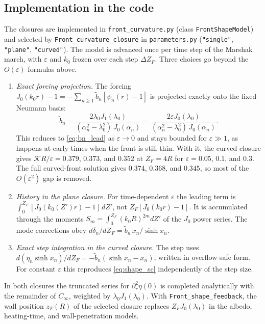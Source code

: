 \documentclass[11pt]{article}
\numberwithin{equation}{section}
\begin{document}
\subsection{Implementation in the code}
The closures are implemented in \texttt{front\_curvature.py} (class \texttt{FrontShapeModel}) and selected by \texttt{Front\_curvature\_closure} in \texttt{parameters.py} (\texttt{"single"}, \texttt{"plane"}, \texttt{"curved"}). The model is advanced once per time step of the Marshak march, with $\varepsilon$ and $k_0$ frozen over each step $\Delta Z_F$. Three choices go beyond the $O(\varepsilon)$ formulas above.
\begin{enumerate}
\item \emph{Exact forcing projection.} The forcing $J_0(k_0r)-1=-\sum_{n\ge1}\tilde b_n[\psi_n(r)-1]$ is projected exactly onto the fixed Neumann basis:
\begin{equation}\tilde b_n=\frac{2\lambda_0J_1(\lambda_0)}{(\alpha_n^2-\lambda_0^2)\,J_0(\alpha_n)}=\frac{2\varepsilon J_0(\lambda_0)}{(\alpha_n^2-\lambda_0^2)\,J_0(\alpha_n)}.\end{equation}
This reduces to \eqref{eq:bn_lead} as $\varepsilon\to0$ and stays bounded for $\varepsilon\gg1$, as happens at early times when the front is still thin. With it, the curved closure gives $\mathcal KR/\varepsilon=0.379$, $0.373$, and $0.352$ at $Z_F=4R$ for $\varepsilon=0.05$, $0.1$, and $0.3$. The full curved-front solution gives $0.374$, $0.368$, and $0.345$, so most of the $O(\varepsilon^2)$ gap is removed.
\item \emph{History in the plane closure.} For time-dependent $\varepsilon$ the leading term is $\int_0^{Z_F}[J_0(k_0(Z')r)-1]\,dZ'$, not $Z_F[J_0(k_0r)-1]$. It is accumulated through the moments $S_m=\int_0^{Z_F}(k_0R)^{2m}dZ'$ of the $J_0$ power series. The mode corrections obey $d\delta_n/dZ_F=\tilde b_n\,x_n/\sinh x_n$.
\item \emph{Exact step integration in the curved closure.} The step uses $d(\eta_n\sinh x_n)/dZ_F=-\tilde b_n(\sinh x_n-x_n)$, written in overflow-safe form. For constant $\varepsilon$ this reproduces \eqref{eq:shape_sc} independently of the step size.
\end{enumerate}
In both closures the truncated series for $\partial_r^2\eta(0)$ is completed analytically with the remainder of $C_\infty$, weighted by $\lambda_0J_1(\lambda_0)$. With \texttt{Front\_shape\_feedback}, the wall position $z_F(R)$ of the selected closure replaces $Z_FJ_0(\lambda_0)$ in the albedo, heating-time, and wall-penetration models.
\end{document}
